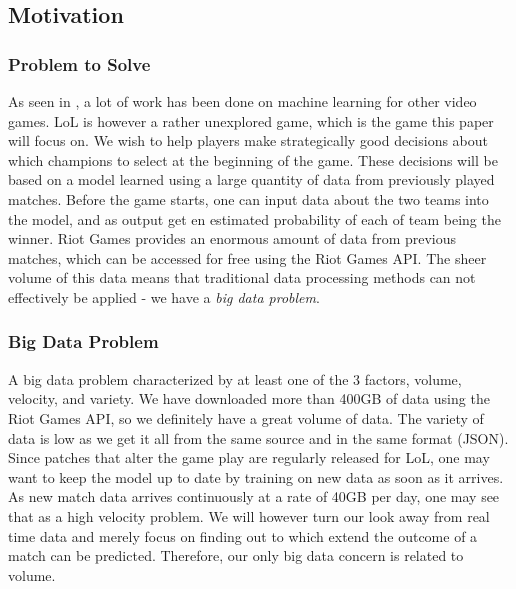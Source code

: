 \subsection{Motivation}\label{sec:motivation}

\subsubsection{Problem to Solve} %
\label{sec:problem_to_solve}
As seen in , a lot of work has been done on machine learning for other video games. LoL is however a rather unexplored game, which is the game this paper will focus on. We wish to help players make strategically good decisions about which champions to select at the beginning of the game.
These decisions will be based on a model learned using a large quantity of data from previously played matches. Before the game starts, one can input data about the two teams into the model, and as output get en estimated probability of each of team being the winner.
Riot Games provides an enormous amount of data from previous matches, which can be accessed for free using the Riot Games API.
The sheer volume of this data means that traditional data processing methods can not effectively be applied - we have a \emph{big data problem}. 


\subsubsection{Big Data Problem} %
\label{sec:big_data_problem}

A big data problem characterized by at least one of the 3 factors, volume, velocity, and variety. We have downloaded more than 400GB of data using the Riot Games API, so we definitely have a great volume of data. The variety of data is low as we get it all from the same source and in the same format (JSON). Since patches that alter the game play are regularly released for LoL, one may want to keep the model up to date by training on new data as soon as it arrives. As new match data arrives continuously at a rate of 40GB per day, one may see that as a high velocity problem. We will however turn our look away from real time data and merely focus on finding out to which extend the outcome of a match can be predicted. Therefore, our only big data concern is related to volume.

